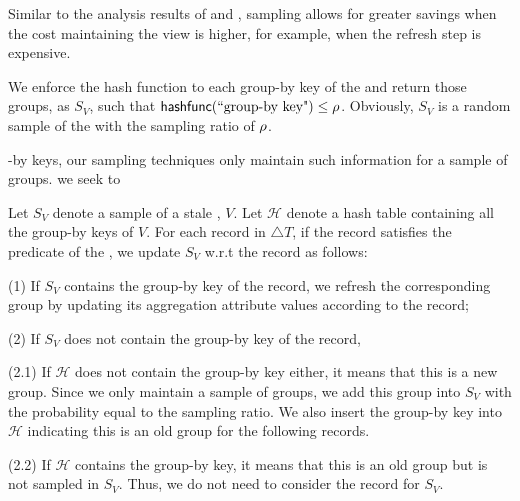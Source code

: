 Similar to the analysis results of \spview and \fjview, sampling allows for greater savings when the cost maintaining the view is higher, for example, when the refresh step is expensive.


\iffalse
We enforce the hash function to each group-by key of the \aggview and return those groups, as $S_{V}$, such that $\textsf{hashfunc}(\textrm{``group-by key"}) \leq \rho $. Obviously, $S_{V}$ is a random sample of the \aggview with the sampling ratio of $\rho $. 

-by keys, our sampling techniques only maintain such information for a sample of groups. we seek to 


 

Let $S_{V}$ denote a sample of a stale \aggview, $V$. Let $\mathcal{H}$ denote a hash table containing all the group-by keys of $V$. For each record in $\triangle T$, if the record satisfies the predicate of the \aggview, we update $S_{V}$ w.r.t the record as follows: 
\vspace{.25em}

(1) If $S_{V}$ contains the group-by key of the record, we refresh the corresponding group by updating its aggregation attribute values according to the record;

\vspace{.25em}

(2) If $S_{V}$ does not contain the group-by key of the record,

\vspace{.25em}

(2.1) If $\mathcal{H}$ does not contain the group-by key either, it means that this is a new group. Since we only maintain a sample of groups, we add this group into $S_{V}$ with the probability equal to the sampling ratio. We also insert the group-by key into $\mathcal{H}$ indicating this is an old group for the following records.

\vspace{.25em}

(2.2) If $\mathcal{H}$ contains the group-by key, it means that this is an old group but is not sampled in $S_{V}$. Thus, we do not need to consider the record for $S_{V}$.




